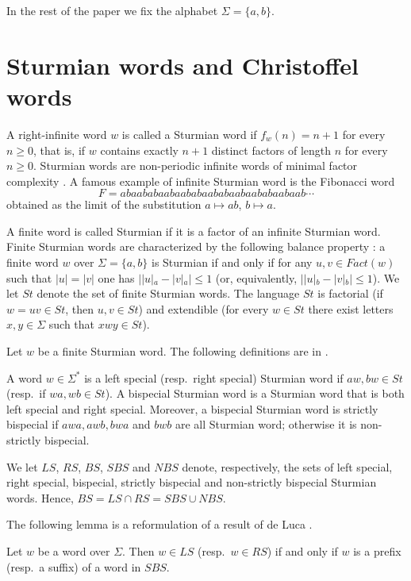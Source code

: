\documentclass{llncs}
\newcommand{\Fact}{\textit{Fact}}
\newcommand{\St}{\textit{St}}
\newcommand{\LS}{\textit{LS}}
\newcommand{\RS}{\textit{RS}}
\newcommand{\BS}{\textit{BS}}
\newcommand{\SBS}{\textit{SBS}}
\newcommand{\WBS}{\textit{NBS}}
\begin{document}
In the rest of the paper we fix the alphabet $\Sigma=\{a,b\}$.

\section{Sturmian words and Christoffel words}\label{sec:StCh}


A right-infinite word $w$ is called a Sturmian word if $f_{w}(n)=n+1$ for every $n\ge 0$, that is, if $w$ contains exactly $n+1$ distinct factors of length $n$ for every $n\ge 0$. Sturmian words are non-periodic infinite words of minimal factor complexity \cite{CoHe73}.
A famous example of infinite Sturmian word is the Fibonacci word $$F=abaababaabaababaababaabaababaabaab\cdots$$ obtained as the limit of the substitution $a\mapsto ab$, $b\mapsto a$. 

A finite word is called Sturmian if it is a factor of an infinite Sturmian word. Finite Sturmian words are characterized by the following balance property \cite{DuGB90}: a finite word $w$ over $\Sigma=\{a,b\}$ is Sturmian if and only if for any $u,v\in \Fact(w)$ such that $|u|=|v|$ one has $||u|_{a}-|v|_{a}|\le 1$ (or, equivalently, $||u|_{b}-|v|_{b}|\le 1$). We let $\St$ denote the set of finite Sturmian words. The language $\St$ is factorial (if $w=uv\in \St$, then $u,v\in \St$) and extendible (for every $w\in \St$ there exist letters $x,y\in \Sigma$ such that $xwy\in \St$).

Let $w$ be a finite Sturmian word. The following definitions are in \cite{DelMi94}. 

\begin{definition}
A word  $w\in \Sigma^{*}$ is a  left special (resp.~right special) Sturmian word if $aw,bw\in \St$ (resp.~if $wa,wb\in \St$). A bispecial Sturmian word is a Sturmian word that is both left special and right special. Moreover, a bispecial Sturmian word is strictly bispecial if $awa,awb,bwa$ and $bwb$ are all Sturmian word; otherwise it is non-strictly bispecial. 
\end{definition}

We let $\LS$, $\RS$, $\BS$, $\SBS$ and $\WBS$ denote, respectively, the sets of left special, right special, bispecial, strictly bispecial and non-strictly bispecial Sturmian words. Hence, $\BS=\LS\cap \RS=\SBS\cup \WBS$.

The following lemma is a reformulation of a result of de Luca \cite{Del97}.

\begin{lemma}\label{lem:prefsuf}
Let $w$ be a word over $\Sigma$. Then $w\in \LS$ (resp.~$w\in \RS$) if and only if $w$ is a prefix (resp.~a suffix) of a word in $\SBS$.
\end{lemma}
\end{document}
